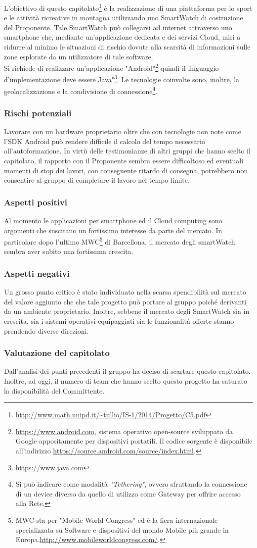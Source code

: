 L’obiettivo di questo capitolato\footnote{\url{http://www.math.unipd.it/~tullio/IS-1/2014/Progetto/C5.pdf}} è la realizzazione di una piattaforma per lo sport e le attività ricreative in montagna utilizzando uno SmartWatch di costruzione del Proponente. Tale SmartWatch può collegarsi ad internet attraverso uno smartphone che, mediante un’applicazione dedicata e dei servizi Cloud, miri a ridurre al minimo le situazioni di rischio dovute alla scarsità di informazioni sulle zone esplorate da un utilizzatore di tale software.\\
Si richiede di realizzare un'applicazione "Android"\footnote{\url{https://www.android.com}, sistema operativo open-source sviluppato da Google appositamente per dispositivi portatili. Il codice sorgente è disponibile all'indirizzo \url{https://source.android.com/source/index.html}.} quindi il linguaggio d'implementazione deve essere Java"\footnote{\url{https://www.java.com}}. Le tecnologie coinvolte sono, inoltre, la geolocalizzazione e la condivisione di connessione\footnote{Si può indicare come modalità \textit{"Tethering"}, ovvero sfruttando la connessione di un device diverso da quello di utilizzo come Gateway per offrire accesso alla Rete.}.
\subsubsection{Rischi potenziali}
Lavorare con un hardware proprietario oltre che con tecnologie non note come l’SDK Android può rendere difficile il calcolo del tempo necessario all’autoformazione.
In virtù delle testimonianze di altri gruppi che hanno scelto il capitolato, il rapporto con il Proponente sembra essere difficoltoso ed eventuali momenti di stop dei lavori, con conseguente ritardo di consegna, potrebbero non consentire al gruppo di completare il lavoro nel tempo limite.
\subsubsection{Aspetti positivi}
Al momento le applicazioni per smartphone ed il Cloud computing sono argomenti che suscitano un fortissimo interesse da parte del mercato. In particolare dopo l'ultimo MWC\footnote{MWC sta per "Mobile World Congress" ed è la fiera internazionale specializzata su Software e dispositivi del mondo Mobile più grande in Europa.\url{http://www.mobileworldcongress.com/}.} di Barcellona, il mercato degli smartWatch sembra aver subito una fortissima crescita.
\subsubsection{Aspetti negativi}
Un grosso punto critico è stato individuato nella scarsa spendibilità sul mercato del valore aggiunto che che tale progetto può portare al gruppo poiché derivanti da un ambiente proprietario. Inoltre, sebbene il mercato degli SmartWatch sia in crescita, sia i sistemi operativi equipaggiati sia le funzionalità offerte stanno prendendo diverse direzioni.
\subsubsection{Valutazione del capitolato}
Dall’analisi dei punti precedenti il gruppo ha deciso di scartare questo capitolato.
Inoltre, ad oggi, il numero di team che hanno scelto questo progetto ha saturato la disponibilità del Committente.